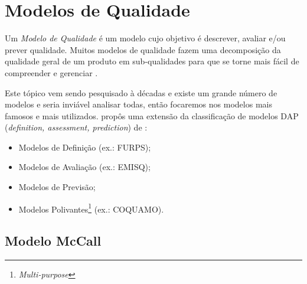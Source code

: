 \documentclass[
	12pt,				%
	openright,			%
	twoside,			%
	a4paper,			%
	english,			%
	brazil,				%
	]{abntex2}
\begin{document}
\section{Modelos de Qualidade}

Um \emph{Modelo de Qualidade} é um modelo cujo objetivo é descrever, avaliar e/ou prever qualidade. Muitos modelos de qualidade fazem uma decomposição da qualidade geral de um produto em sub-qualidades para que se torne mais fácil de compreender e gerenciar \cite{wagner2013}.

Este tópico vem sendo pesquisado à décadas e existe um grande número de modelos \cite{Klas2009} e seria inviável analisar todas, então focaremos nos modelos mais famosos e mais utilizados.  propôs uma extensão da classificação de modelos DAP (\emph{definition, assessment, prediction}) de :
\begin{itemize}
    \item Modelos de Definição (ex.: FURPS);
    \item Modelos de Avaliação (ex.: EMISQ);
    \item Modelos de Previsão;
    \item Modelos Polivantes\footnote{\emph{Multi-purpose}} (ex.: COQUAMO).
\end{itemize}

\subsection{Modelo McCall}

\end{document}
